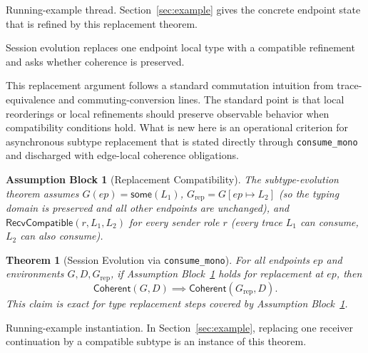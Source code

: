 \documentclass[a4paper,10pt,twocolumn,english]{article}
\numberwithin{equation}{section}
\theoremstyle{paperdef}
\theoremstyle{paperplain}
\newtheorem{theorem}[definition]{Theorem}
\theoremstyle{paperdef}
\newtheorem{assumption}{Assumption Block}[section]
\theoremstyle{paperremark}
\newcommand{\Coherent}{\ensuremath{\mathsf{Coherent}}}
\newcommand{\RecvCompatible}{\ensuremath{\mathsf{RecvCompatible}}}
\begin{document}
Running-example thread. Section~\ref{sec:example} gives the concrete endpoint
state that is refined by this replacement theorem.

Session evolution replaces one endpoint local type with a compatible refinement and asks whether coherence is preserved.

This replacement argument follows a standard commutation intuition from trace-equivalence and commuting-conversion lines. The standard point is that local reorderings or local refinements should preserve observable behavior when compatibility conditions hold. What is new here is an operational criterion for asynchronous subtype replacement that is stated directly through \nolinkurl{consume_mono} and discharged with edge-local coherence obligations.

\begin{assumption}[Replacement Compatibility]
	\label{assump:p1-replacement}
	The subtype-evolution theorem assumes $G(ep)=\mathsf{some}(L_1)$, $G_{\mathrm{rep}} = G[ep\mapsto L_2]$ (so the typing domain is preserved and all other endpoints are unchanged), and $\RecvCompatible(r,L_1,L_2)$ for every sender role $r$ (every trace $L_1$ can consume, $L_2$ can also consume).
\end{assumption}

\begin{theorem}[Session Evolution via \nolinkurl{consume_mono}]
	\label{thm:session-evolution}
	For all endpoints $ep$ and environments $G,D,G_{\mathrm{rep}}$, if Assumption Block~\ref{assump:p1-replacement} holds for replacement at $ep$, then
	\begin{equation}
		\Coherent(G,D) \implies \Coherent(G_{\mathrm{rep}},D).
	\end{equation}
	This claim is exact for type replacement steps covered by Assumption Block~\ref{assump:p1-replacement}.
\end{theorem}

Running-example instantiation. In Section~\ref{sec:example}, replacing one
receiver continuation by a compatible subtype is an instance of this theorem.
\end{document}
